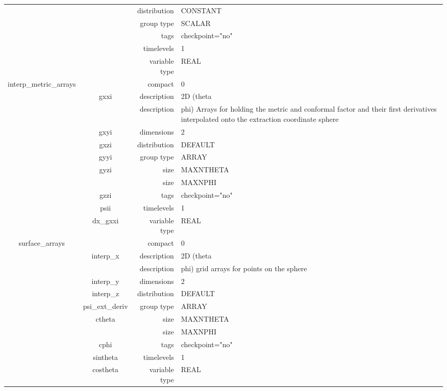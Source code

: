\begin{tabular*}{150mm}{|c|c@{\extracolsep{\fill}}|rl|}
 &  & distribution & CONSTANT \\ 
 &  & group type & SCALAR \\ 
 &  & tags & checkpoint="no" \\ 
 &  & timelevels & 1 \\ 
 &  & variable type & REAL \\ 
\hline 
interp\_metric\_arrays &  & compact & 0 \\ 
 & gxxi & description & 2D (theta \\ 
& ~ & description & phi) Arrays for holding the metric and conformal factor and their first derivatives interpolated onto the extraction coordinate sphere \\ 
 & gxyi & dimensions & 2 \\ 
 & gxzi & distribution & DEFAULT \\ 
 & gyyi & group type & ARRAY \\ 
 & gyzi & size & MAXNTHETA \\ 
& ~ & size & MAXNPHI \\ 
 & gzzi & tags & checkpoint="no" \\ 
 & psii & timelevels & 1 \\ 
 & dx\_gxxi & variable type & REAL \\ 
\hline 
surface\_arrays &  & compact & 0 \\ 
 & interp\_x & description & 2D (theta \\ 
& ~ & description & phi) grid arrays for points on the sphere \\ 
 & interp\_y & dimensions & 2 \\ 
 & interp\_z & distribution & DEFAULT \\ 
 & psi\_ext\_deriv & group type & ARRAY \\ 
 & ctheta & size & MAXNTHETA \\ 
& ~ & size & MAXNPHI \\ 
 & cphi & tags & checkpoint="no" \\ 
 & sintheta & timelevels & 1 \\ 
 & costheta & variable type & REAL \\ 
\hline 
\end{tabular*} 



\vspace{5mm}
\vspace{5mm}

